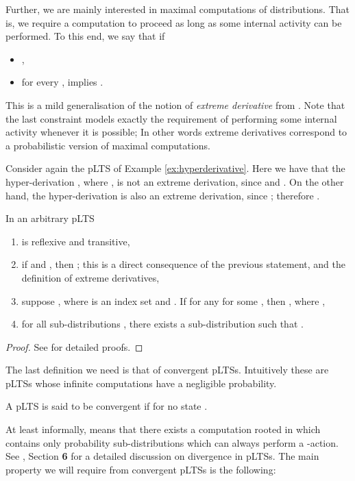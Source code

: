 \documentclass{LMCS}
\begin{document}
Further, we are mainly interested in maximal computations of distributions. That is, we require a computation 
to proceed as long as some internal activity can be performed.
To this end, we  say that  if
\begin{itemize}
\item ,
\item for every  
,  implies . 
\end{itemize}
\noindent
This is a mild generalisation of the notion of \emph{extreme derivative} from \cite{DGHM09full}.
Note that the last constraint models exactly the requirement of performing some internal activity 
whenever it is possible;  In other words extreme derivatives correspond to a probabilistic
version of maximal computations.

\begin{exa}
Consider again the pLTS of Example \ref{ex:hyperderivative}. Here we have that 
the hyper-derivation , where , is not an extreme derivation, since  and . 
On the other hand, the hyper-derivation  is also an extreme derivation, 
since ; therefore .
\end{exa}

\begin{thm}\label{thm:hyper}
  In an arbitrary pLTS
  \begin{enumerate}[label=(\roman*)]
  \item  is reflexive and transitive,
  \item if  and , then ; 
   this is a direct consequence of the previous statement, and the definition of extreme derivatives,
  \item suppose , where  is an index set and 
  . If for any 
   for some , then , where 
  ,
  \item for all sub-distributions , there exists a sub-distribution  such that 
   .
  \end{enumerate}
\end{thm}
\begin{proof}
  See \cite{DGHM09full} for detailed proofs. 
\end{proof}

The last definition we need is that of convergent pLTSs. 
Intuitively these are pLTSs whose infinite computations 
have a negligible probability.
\begin{defi}[Convergence]
A pLTS  
is said to be convergent if  
for no state . 
\end{defi}
\noindent
At least informally,  means that 
there exists a computation rooted in  which contains 
only probability sub-distributions which 
can always perform a -action. 
See \cite{DGHM09full}, Section \textbf{6} 
for a detailed discussion on divergence in pLTSs.
The main property we will require from convergent pLTSs 
	is the following:
\end{document}
